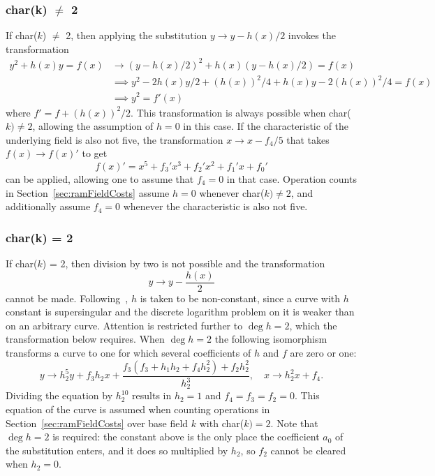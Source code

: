 \subsubsection{char(k) $\neq$ 2}
If char($k$) $\neq$ 2, then applying the substitution $y \rightarrow y - h(x)/2$
invokes the transformation 
\begin{align*}
y^2 + h(x)y = f(x) &\rightarrow (y-h(x)/2)^2 + h(x)(y - h(x)/2) = f(x) \\
                   &\implies y^2 -2h(x)y/2 + (h(x))^2/4 + h(x)y -2(h(x))^2/4 = f(x) \\
                   &\implies y^2 = f'(x)
\end{align*} 
where $f' = f + (h(x))^2/2$. This transformation is always possible when
char($k) \neq 2$, allowing the assumption of $h=0$ in this case. If the
characteristic of the underlying field is also not five, the transformation $ x
\rightarrow x - f_4/5 $ that takes $f(x) \rightarrow f(x)'$ to get $$ f(x)' =
x^5 + f_3'x^3 + f_2'x^2 + f_1'x + f_0'$$ can be applied, allowing one to assume
that $f_4 = 0$ in that case. Operation counts in Section~\ref{sec:ramFieldCosts}
assume $h = 0$ whenever char($k) \neq 2$, and additionally assume $f_4 = 0$
whenever the characteristic is also not five.

\subsubsection{char(k) = 2}
If char($k$) = 2, then division by two is not
possible and the transformation $$ y \rightarrow y - \frac{h(x)}{2}$$ cannot be
made. Following~\cite{Lange_explicit_2005}, $h$ is taken to be non-constant,
since a curve with $h$ constant is supersingular and the discrete logarithm
problem on it is weaker than on an arbitrary curve. Attention is restricted
further to $\deg h = 2$, which the transformation below requires. When $\deg h =
2$ the
following isomorphism transforms a curve to one for which several coefficients
of $h$ and $f$ are zero or one: $$ y \rightarrow h_2^5y + f_3h_2x +
\frac{f_3(f_3 + h_1h_2 + f_4h_2^2) + f_2h_2^2}{h_2^3}, \quad x\rightarrow
h_2^2x + f_4.$$ Dividing the equation by $h_2^{10}$ results in $h_2 =1$ and $f_4
= f_3 = f_2 = 0$. This equation of the curve is assumed when counting operations
in Section~\ref{sec:ramFieldCosts} over base field $k$ with char($k) = 2$. Note
that $\deg h = 2$ is required: the constant above is the only place the
coefficient $a_0$ of the substitution enters, and it does so multiplied by
$h_2$, so $f_2$ cannot be cleared when $h_2 = 0$. 

